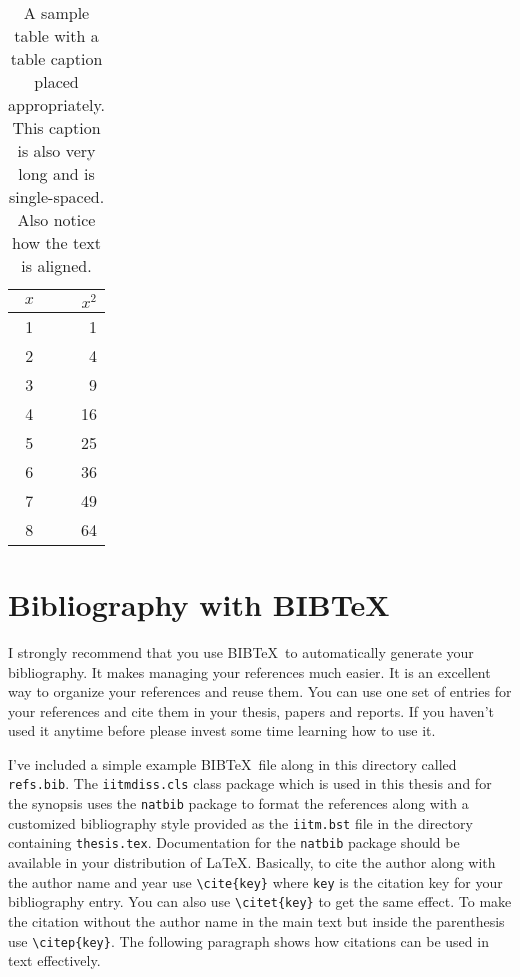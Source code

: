 \begin{table}[htbp]
  \caption{A sample table with a table caption placed
    appropriately. This caption is also very long and is
    single-spaced.  Also notice how the text is aligned.}
  \begin{center}
  \begin{tabular}[c]{|c|r|} \hline
    $x$ & $x^2$ \\ \hline
    1  &  1   \\
    2  &  4  \\
    3  &  9  \\
    4  &  16  \\
    5  &  25  \\
    6  &  36  \\
    7  &  49  \\
    8  &  64  \\ \hline
  \end{tabular}
  \label{tab:sample}
  \end{center}
\end{table}

\section{Bibliography with BIB\TeX}

I strongly recommend that you use BIB\TeX\ to automatically generate
your bibliography.  It makes managing your references much easier.  It
is an excellent way to organize your references and reuse them.  You
can use one set of entries for your references and cite them in your
thesis, papers and reports.  If you haven't used it anytime before
please invest some time learning how to use it.  

I've included a simple example BIB\TeX\ file along in this directory
called \verb+refs.bib+.  The \verb+iitmdiss.cls+ class package which
is used in this thesis and for the synopsis uses the \verb+natbib+
package to format the references along with a customized bibliography
style provided as the \verb+iitm.bst+ file in the directory containing
\verb+thesis.tex+.  Documentation for the \verb+natbib+ package should
be available in your distribution of \LaTeX.  Basically, to cite the
author along with the author name and year use \verb+\cite{key}+ where
\verb+key+ is the citation key for your bibliography entry.  You can
also use \verb+\citet{key}+ to get the same effect.  To make the
citation without the author name in the main text but inside the
parenthesis use \verb+\citep{key}+.  The following paragraph shows how
citations can be used in text effectively.

